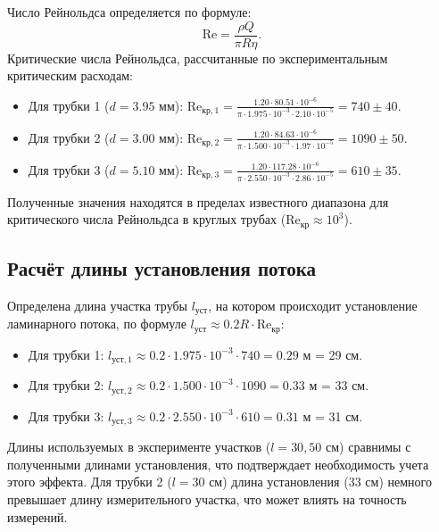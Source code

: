 \documentclass[a4paper]{article}
\begin{document}
Число Рейнольдса определяется по формуле:
\[
\text{Re} = \frac{\rho Q}{\pi R \eta}.
\]
Критические числа Рейнольдса, рассчитанные по экспериментальным критическим расходам:
\begin{itemize}
	\item Для трубки 1 ($d=3.95$ мм): $\text{Re}_{\text{кр},1} = \frac{1.20 \cdot 80.51 \cdot 10^{-6}}{\pi \cdot 1.975 \cdot 10^{-3} \cdot 2.10 \cdot 10^{-5}} = 740 \pm 40.$
	\item Для трубки 2 ($d=3.00$ мм): $\text{Re}_{\text{кр},2} = \frac{1.20 \cdot 84.63 \cdot 10^{-6}}{\pi \cdot 1.500 \cdot 10^{-3} \cdot 1.97 \cdot 10^{-5}} = 1090 \pm 50.$  
	\item Для трубки 3 ($d=5.10$ мм): $\text{Re}_{\text{кр},3} = \frac{1.20 \cdot 117.28 \cdot 10^{-6}}{\pi \cdot 2.550 \cdot 10^{-3} \cdot 2.86 \cdot 10^{-5}} = 610 \pm 35.$ 
\end{itemize}
Полученные значения находятся в пределах известного диапазона для критического числа Рейнольдса в круглых трубах ($\text{Re}_{\text{кр}} \approx 10^3$).
\subsection*{Расчёт длины установления потока}

Определена длина участка трубы $l_{\text{уст}}$, на котором происходит установление ламинарного потока, по формуле $l_{\text{уст}} \approx 0.2 R \cdot \text{Re}_{\text{кр}}$:
\begin{itemize}
	\item Для трубки 1: $l_{\text{уст},1} \approx 0.2 \cdot 1.975 \cdot 10^{-3} \cdot 740 = 0.29$ м = 29 см.
	\item Для трубки 2: $l_{\text{уст},2} \approx 0.2 \cdot 1.500 \cdot 10^{-3} \cdot 1090 = 0.33$ м = 33 см.
	\item Для трубки 3: $l_{\text{уст},3} \approx 0.2 \cdot 2.550 \cdot 10^{-3} \cdot 610 = 0.31$ м = 31 см.
\end{itemize}
Длины используемых в эксперименте участков ($l=30, 50$ см) сравнимы с полученными длинами установления, что подтверждает необходимость учета этого эффекта. Для трубки 2 ($l = 30$ см) длина установления ($33$ см) немного превышает длину измерительного участка, что может влиять на точность измерений.
\end{document}
